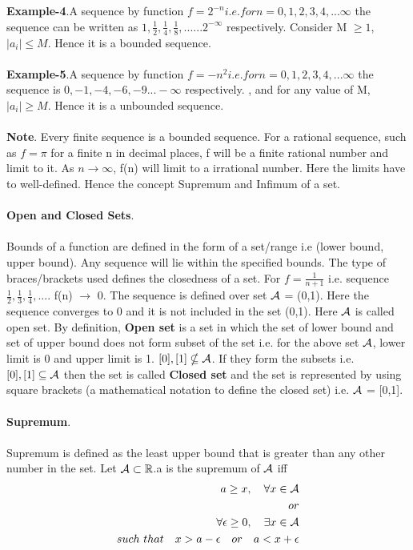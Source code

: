 \documentclass[a4paper]{article}
\begin{document}
\\
\\
\textbf{Example-4}.A sequence by function $f=2^{-n} i.e. for n=0, 1 ,2,3,4,...\infty$ the sequence can be written as $1,\frac{1}{2},\frac{1}{4},\frac{1}{8},......2^{-\infty}$ respectively. Consider M $\geq 1$, $\mid a_i \mid \leq M $. Hence it is a bounded sequence.
\\
\\
\textbf{Example-5}.A sequence by function $f=-n^2 i.e. for n=0, 1 ,2,3,4,...\infty$ the sequence is $0,-1,-4,-6,-9...-\infty$ respectively. , and for any value of M, $\mid a_i \mid \geq M $. Hence it is a unbounded sequence. 
\\
\\
\textbf{Note}. Every finite sequence is a bounded sequence. For a rational sequence, such as $f=\pi$ for a finite n in decimal places, f will be a finite rational number and limit to it. As $n \to \infty$, f(n) will limit to a irrational number. Here the limits have to well-defined. Hence the concept Supremum and Infimum of a set.
\\
\\
\textbf{Open and Closed Sets}.
\\
\\
Bounds of a function are defined in the form of a set/range i.e (lower bound, upper bound). Any sequence will lie within the specified bounds. The type of braces/brackets used defines the closedness of a set. For $f=\frac{1}{n+1}$ i.e. sequence $\frac{1}{2},\frac{1}{3},\frac{1}{4},....$ f(n) $\to$ 0. The sequence is defined over set $\mathcal A$ = (0,1). Here the sequence converges to 0 and it is not included in the set (0,1). Here $\mathcal A$ is called open set. By definition, \textbf{Open set} is a set in which the set of lower bound and set of upper bound does not form subset of the set i.e. for the above set $\mathcal A$, lower limit is 0 and upper limit is 1. ${[0]},{[1]} \nsubseteq \mathcal A$. If they form the subsets i.e. ${[0]},{[1]} \subseteq \mathcal A$ then the set is called \textbf{Closed set} and the set is represented by using square brackets (a mathematical notation to define the closed set) i.e. $\mathcal A$ = [0,1].
\\
\\
\textbf{Supremum}.
\\
\\
Supremum is defined as the least upper bound that is greater than any other number in the set. Let $\mathcal A \subset \mathbb R$.a is the supremum of $\mathcal A$ iff\\
\begin{align}
\begin{split}
a \geq x,\quad \forall x \in \mathcal A\\
or\\
\forall \epsilon \geq 0,\quad \exists x \in \mathcal A 
\\such \ that \quad x > a-\epsilon \quad or \quad a < x+\epsilon
\end{split}
\end{align}
\end{document}
